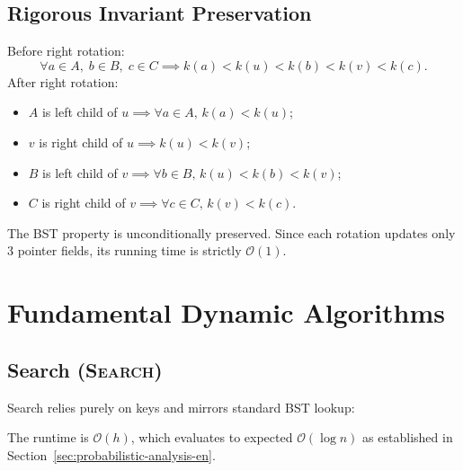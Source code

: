 \subsection{Rigorous Invariant Preservation}
\begin{property}
Before right rotation:
\begin{equation}
  \forall a \in A, \; b \in B, \; c \in C \implies k(a) < k(u) < k(b) < k(v) < k(c).
\end{equation}
After right rotation:
\begin{itemize}
    \item $A$ is left child of $u \implies \forall a \in A, \, k(a) < k(u)$;
    \item $v$ is right child of $u \implies k(u) < k(v)$;
    \item $B$ is left child of $v \implies \forall b \in B, \, k(u) < k(b) < k(v)$;
    \item $C$ is right child of $v \implies \forall c \in C, \, k(v) < k(c)$.
\end{itemize}
The BST property is unconditionally preserved. Since each rotation updates only 3 pointer fields, its running time is strictly $\mathcal{O}(1)$.
\end{property}

\FloatBarrier
\section{Fundamental Dynamic Algorithms}
\label{sec:treap-dynamic-algorithms-en}

\subsection{Search (\textsc{Search})}
Search relies purely on keys and mirrors standard BST lookup:

\begin{algorithm}[H]
\caption{Key Lookup in a Treap ($\textsc{Search}(u, k)$)}
\label{alg:treap-search-en}
\BlankLine
{}
\end{algorithm}

The runtime is $\mathcal{O}(h)$, which evaluates to expected $\mathcal{O}(\log n)$ as established in Section~\ref{sec:probabilistic-analysis-en}.


